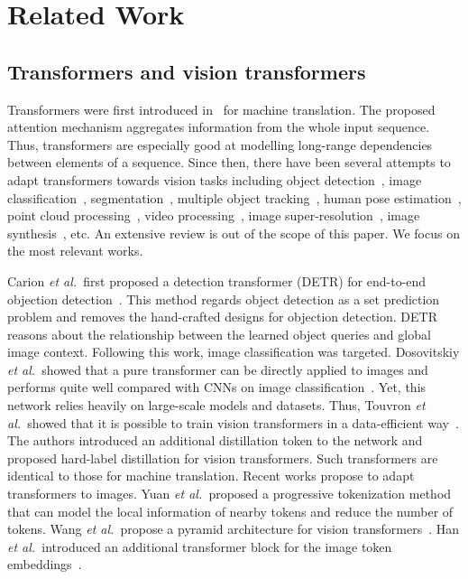 \documentclass[10pt,twocolumn,letterpaper]{article}
\def\etal{\emph{et al.\ }}
\begin{document}
\section{Related Work}
\label{sec:related_works}


\subsection{Transformers and vision transformers}
\label{subsec:transformers}

Transformers were first introduced in~\cite{vaswani2017attention} for machine translation. The proposed attention mechanism aggregates information from the whole input sequence. Thus, transformers are especially good at modelling long-range dependencies between elements of a sequence. Since then, there have been several attempts to adapt transformers towards vision tasks including object detection~\cite{carion2020end,zhu2020deformable}, image classification~\cite{dosovitskiy2020image,touvron2020training,yuan2021tokens,wang2021pyramid,han2021transformer}, segmentation~\cite{wang2020axial}, multiple object tracking~\cite{sun2020transtrack,meinhardt2021trackformer}, human pose estimation~\cite{yang2020transpose,zheng20213d}, point cloud processing~\cite{guo2020pct,zhao2020point}, video processing~\cite{girdhar2019video,neimark2021video,tan2021relaxed}, image super-resolution~\cite{mou2021cola,yang2020learning,chen2020pre}, image synthesis~\cite{esser2020taming}, etc. An extensive review is out of the scope of this paper. We focus on the most relevant works. 

Carion \etal first proposed a detection transformer (DETR) for end-to-end objection detection~\cite{carion2020end}. This method regards object detection as a set prediction problem and removes the hand-crafted designs for objection detection. DETR reasons about the relationship between the learned object queries and global image context. Following this work, image classification was targeted. Dosovitskiy \etal showed that a pure transformer can be directly applied to images and performs quite well compared with CNNs on image classification~\cite{dosovitskiy2020image}. Yet, this network relies heavily on large-scale models and datasets. Thus, Touvron \etal showed that it is possible to train vision transformers in a data-efficient way~\cite{touvron2020training}. The authors introduced an additional distillation token to the network and proposed hard-label distillation for vision transformers. Such transformers are identical to those for machine translation. Recent works propose to adapt transformers to images. Yuan \etal proposed a progressive tokenization method that can model the local information of nearby tokens and reduce the number of tokens. Wang \etal propose a pyramid architecture for vision transformers~\cite{wang2021pyramid}. Han \etal introduced an additional transformer block for the image token embeddings~\cite{han2021transformer}.
 
\end{document}
